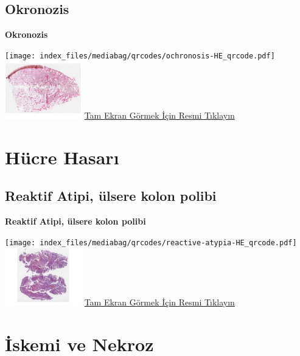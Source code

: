\documentclass[
  letterpaper,
  DIV=11,
  numbers=noendperiod]{scrreprt}
\begin{document}
\hypertarget{sec-okronozis}{%
\section{Okronozis}\label{sec-okronozis}}

\textbf{Okronozis}

\texttt{[image: index\_files/mediabag/qrcodes/ochronosis-HE\_qrcode.pdf]}
\href{https://images.patolojiatlasi.com/ochronosis/HE.html}{\includegraphics[width=0.25\textwidth,height=\textheight]{./screenshots/thumbnail_ochronosis.png}}
\href{https://images.patolojiatlasi.com/ochronosis/HE.html}{Tam Ekran
Görmek İçin Resmi Tıklayın}

\hypertarget{sec-hucre-hasari}{%
\chapter{Hücre Hasarı}\label{sec-hucre-hasari}}

\hypertarget{sec-reaktif-atipi}{%
\section{Reaktif Atipi, ülsere kolon polibi}\label{sec-reaktif-atipi}}

\textbf{Reaktif Atipi, ülsere kolon polibi}

\texttt{[image: index\_files/mediabag/qrcodes/reactive-atypia-HE\_qrcode.pdf]}
\href{https://images.patolojiatlasi.com/reactive-atypia/HE.html}{\includegraphics[width=0.25\textwidth,height=\textheight]{./screenshots/thumbnail_reactive-atypia.png}}
\href{https://images.patolojiatlasi.com/reactive-atypia/HE.html}{Tam
Ekran Görmek İçin Resmi Tıklayın}

\hypertarget{sec-iskemi-ve-nekroz}{%
\chapter{İskemi ve Nekroz}\label{sec-iskemi-ve-nekroz}}
\end{document}
